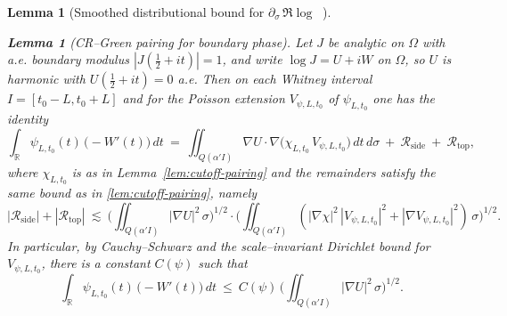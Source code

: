 \documentclass[11pt]{article}
\newtheorem{lemma}[theorem]{Lemma}
\theoremstyle{definition}
\theoremstyle{remark}
\newcommand{\R}{\mathbb{R}}
\DeclareMathOperator{\dettwo}{det_2}
\begin{document}
\begin{lemma}[Smoothed distributional bound for $\partial_\sigma\,\Re\log\dettwo$]
\begin{lemma}[CR–Green pairing for boundary phase]\label{lem:CR-green-phase}
Let $J$ be analytic on $\Omega$ with a.e. boundary modulus $|J(\tfrac12+it)|=1$, and write $\log J=U+iW$ on $\Omega$, so $U$ is harmonic with $U(\tfrac12+it)=0$ a.e. Then on each Whitney interval $I=[t_0-L,t_0+L]$ and for the Poisson extension $V_{\psi,L,t_0}$ of $\psi_{L,t_0}$ one has the identity
\[
  \int_{\R} \psi_{L,t_0}(t)\,\big(-W'(t)\big)\,dt\ =\ \iint_{Q(\alpha'I)} \nabla U\cdot \nabla\big(\chi_{L,t_0}\,V_{\psi,L,t_0}\big)\,dt\,d\sigma\ +\ \mathcal R_{\mathrm{side}}\ +\ \mathcal R_{\mathrm{top}},
\]
where $\chi_{L,t_0}$ is as in Lemma~\ref{lem:cutoff-pairing} and the remainders satisfy the same bound as in \eqref{lem:cutoff-pairing}, namely
\[
  |\mathcal R_{\mathrm{side}}|+|\mathcal R_{\mathrm{top}}|
  \ \lesssim\ \Big(\iint_{Q(\alpha'I)} |\nabla U|^2\,\sigma\Big)^{1/2}
                \cdot \Big(\iint_{Q(\alpha' I)} (|\nabla\chi|^2\,|V_{\psi,L,t_0}|^2+|\nabla V_{\psi,L,t_0}|^2)\,\sigma\Big)^{1/2}.
\]
In particular, by Cauchy–Schwarz and the scale–invariant Dirichlet bound for $V_{\psi,L,t_0}$, there is a constant $C(\psi)$ such that
\[
  \int_{\R} \psi_{L,t_0}(t)\,\big(-W'(t)\big)\,dt\ \le\ C(\psi)\,\Big(\iint_{Q(\alpha'I)} |\nabla U|^2\,\sigma\Big)^{1/2}.
\]
\end{lemma}


\end{lemma}
\end{document}

